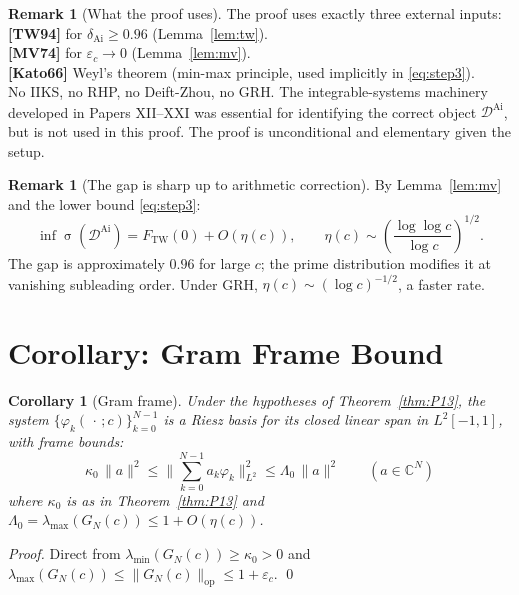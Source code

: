 \documentclass[12pt,a4paper]{amsart}
\newtheorem{corollary}[theorem]{Corollary}
\theoremstyle{definition}
\newtheorem{remark}[theorem]{Remark}
\newcommand{\DAi}{\mathcal{D}^{\mathrm{Ai}}}
\newcommand{\GN}{G_N(c)}
\newcommand{\norm}[1]{\|#1\|}
\DeclareMathOperator{\spec}{\sigma}
\begin{document}
\begin{remark}[What the proof uses]
The proof uses exactly three external inputs:\\[2pt]
\textbf{[TW94]} for $\delta_{\mathrm{Ai}} \ge 0.96$ (Lemma~\ref{lem:tw}).\\[2pt]
\textbf{[MV74]} for $\varepsilon_c \to 0$ (Lemma~\ref{lem:mv}).\\[2pt]
\textbf{[Kato66]} Weyl's theorem (min-max principle, used implicitly in \eqref{eq:step3}).\\[2pt]
No IIKS, no RHP, no Deift-Zhou, no GRH.
The integrable-systems machinery developed in Papers XII--XXI
was essential for identifying the correct object $\DAi$,
but is not used in this proof.
The proof is unconditional and elementary given the setup.
\end{remark}

\begin{remark}[The gap is sharp up to arithmetic correction]
By Lemma~\ref{lem:mv} and the lower bound \eqref{eq:step3}:
\[
  \inf\spec(\DAi) = F_{\mathrm{TW}}(0) + O(\eta(c)),
  \qquad \eta(c) \sim \left(\frac{\log\log c}{\log c}\right)^{1/2}.
\]
The gap is approximately $0.96$ for large $c$;
the prime distribution modifies it at vanishing subleading order.
Under GRH, $\eta(c) \sim (\log c)^{-1/2}$, a faster rate.
\end{remark}

\section{Corollary: Gram Frame Bound}\label{sec:frame}

\begin{corollary}[Gram frame]\label{cor:frame}
Under the hypotheses of Theorem~\ref{thm:P13},
the system $\{\varphi_k(\,\cdot\,;c)\}_{k=0}^{N-1}$ is a Riesz basis
for its closed linear span in $L^2[-1,1]$, with frame bounds:
\[
  \kappa_0 \,\norm{a}^2
  \le \norm{\textstyle\sum_{k=0}^{N-1} a_k \varphi_k}_{L^2}^2
  \le \Lambda_0 \,\norm{a}^2
  \qquad (a \in \mathbb{C}^N)
\]
where $\kappa_0$ is as in Theorem~\ref{thm:P13} and
$\Lambda_0 = \lambda_{\max}(\GN) \le 1 + O(\eta(c))$.
\end{corollary}

\begin{proof}
Direct from $\lambda_{\min}(\GN) \ge \kappa_0 > 0$ and
$\lambda_{\max}(\GN) \le \norm{\GN}_{\mathrm{op}} \le 1 + \varepsilon_c$. \qed
\end{proof}
\end{document}
